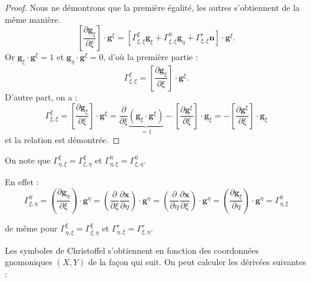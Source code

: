 \begin{proof}
Nous ne démontrons que la première égalité, les autres s'obtiennent de la même manière.
\begin{equation}
\left[ \dfrac{\partial \mathbf{g}_{\xi}}{\partial \xi} \right] \cdot \mathbf{g}^{\xi} = \left[ \Gamma_{\xi,\xi}^{\xi} \mathbf{g}_{\xi} + \Gamma_{\xi,\xi}^{\eta} \mathbf{g}_{\eta} + \Gamma_{\xi,\xi}^r \mathbf{n}\right] \cdot \mathbf{g}^{\xi}.
\end{equation}
Or $\mathbf{g}_{\xi} \cdot \mathbf{g}^{\xi} = 1$ et $\mathbf{g}_{\eta} \cdot \mathbf{g}^{\xi} = 0$, d'où la première partie :
\begin{equation}
\Gamma_{\xi,\xi}^{\xi} = \left[ \dfrac{\partial \mathbf{g}_{\xi}}{\partial \xi} \right] \cdot \mathbf{g}^{\xi}.
\end{equation}
D'autre part, on a :
\begin{equation}
\Gamma_{\xi,\xi}^{\xi} = \left[ \dfrac{\partial \mathbf{g}_{\xi}}{\partial \xi} \right] \cdot \mathbf{g}^{\xi} = \dfrac{\partial}{\partial \xi}  \underbrace{\left(\mathbf{g}_{\xi} \cdot \mathbf{g}^{\xi}\right)}_{=1}  - \left[ \dfrac{\partial \mathbf{g}^{\xi}}{\partial \xi}  \right] \cdot \mathbf{g}_{\xi} = - \left[ \dfrac{\partial \mathbf{g}^{\xi}}{\partial \xi}  \right] \cdot \mathbf{g}_{\xi}
\end{equation}
et la relation est démontrée.
\end{proof}

\begin{remarque}
On note que $\Gamma_{\eta,\xi}^{\xi}=\Gamma_{\xi,\eta}^{\xi}$ et $\Gamma_{\eta,\xi}^{\eta}=\Gamma_{\xi,\eta}^{\eta}$.

En effet :
$$\Gamma_{\xi, \eta}^{\eta} = \left( \dfrac{\partial \mathbf{g}_{\eta}}{\partial \xi} \right) \cdot \mathbf{g}^{\eta} = \left( \dfrac{\partial}{\partial \xi} \dfrac{\partial \mathbf{x}}{\partial \eta} \right) \cdot \mathbf{g}^{\eta} = \left( \dfrac{\partial}{\partial \eta} \dfrac{\partial \mathbf{x}}{\partial \xi} \right) \cdot \mathbf{g}^{\eta} = \left( \dfrac{\partial \mathbf{g}_{\xi}}{\partial \eta} \right) \cdot \mathbf{g}^{\eta} = \Gamma_{\eta, \xi}^{\eta}$$

de même pour $\Gamma_{\eta,\xi}^{\xi}=\Gamma_{\xi,\eta}^{\xi}$ et $\Gamma_{\eta,\xi}^{r}=\Gamma_{\xi,\eta}^{r}$.
\end{remarque}

Les symboles de Christoffel s'obtiennent en fonction des coordonnées gnomoniques $(X,Y)$ de la façon qui suit.
On peut calculer les dérivées suivantes :

